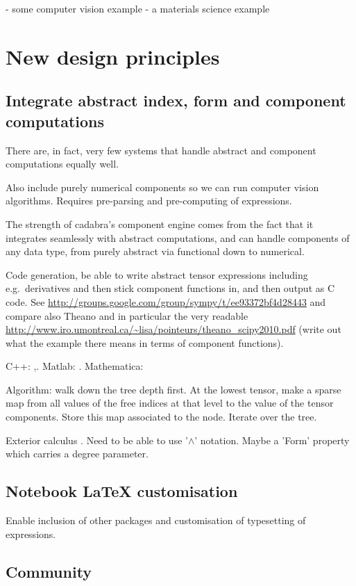 \documentclass[11pt]{article}
\begin{document}
- some computer vision example
- a materials science example


\section{New design principles}
\subsection{Integrate abstract index, form and component computations}

There are, in fact, very few systems that handle abstract and
component computations equally well.

Also include purely numerical components so we can run computer vision
algorithms. Requires pre-parsing and pre-computing of expressions.

The strength of cadabra's component engine comes from the fact that it
integrates seamlessly with abstract computations, and can handle
components of any data type, from purely abstract via functional down
to numerical.

Code generation, be able to write abstract tensor expressions
including e.g.~derivatives and then stick component functions in, and
then output as C code. See
\url{http://groups.google.com/group/sympy/t/ee93372bf4d28443}
and compare also Theano and in particular the
very readable \url{http://www.iro.umontreal.ca/~lisa/pointeurs/theano_scipy2010.pdf}
(write out what the example there means in terms of component functions).

C++: \cite{ltensor},\cite{ftensor}.
Matlab: \cite{TTB_Software}.
Mathematica: \cite{kranc}

Algorithm: walk down the tree depth first. At the lowest tensor, make
a sparse map from all values of the free indices at that level to the
value of the tensor components. Store this map associated to the
node. Iterate over the tree.

Exterior calculus \cite{xTerior}. Need to be able to use '$\wedge$'
notation. Maybe a 'Form' property which carries a degree parameter.


\subsection{Notebook \LaTeX{} customisation}

Enable inclusion of other packages and customisation of typesetting of expressions.

\subsection{Community}
\end{document}
